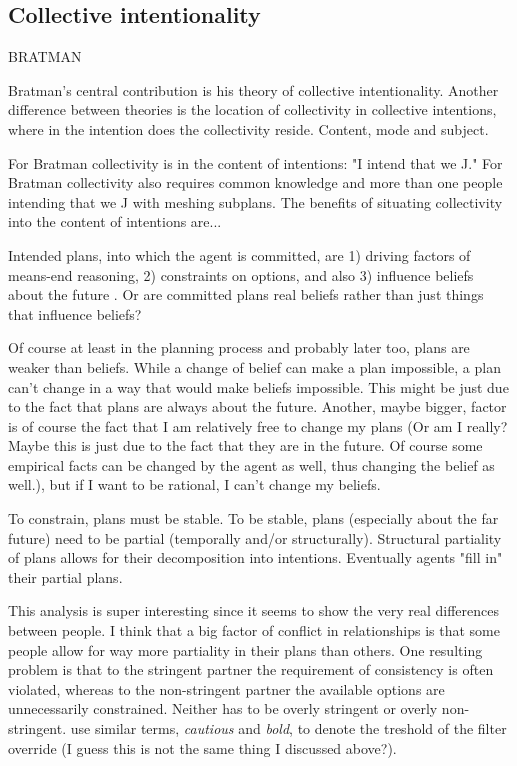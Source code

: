 \subsection{Collective intentionality}
BRATMAN

Bratman's central contribution is his theory of collective intentionality. Another difference between theories is the location of collectivity in collective intentions, where in the intention does the collectivity reside. Content, mode and subject.

For Bratman collectivity is in the content of intentions: "I intend that we J." For Bratman collectivity also requires common knowledge and more than one people intending that we J with meshing subplans. The benefits of situating collectivity into the content of intentions are...

Intended plans, into which the agent is committed, are 1) driving factors of means-end reasoning, 2) constraints on options, and also 3) influence beliefs about the future \citep*[p.~9]{bratman_plans_1988}. Or are committed plans real beliefs rather than just things that influence beliefs? 

Of course at least in the planning process and probably later too, plans are weaker than beliefs. While a change of belief can make a plan impossible, a plan can't change in a way that would make beliefs impossible. This might be just due to the fact that plans are always about the future. Another, maybe bigger, factor is of course the fact that I am relatively free to change my plans (Or am I really? Maybe this is just due to the fact that they are in the future. Of course some empirical facts can be changed by the agent as well, thus changing the belief as well.), but if I want to be rational, I can't change my beliefs.

To constrain, plans must be stable. To be stable, plans (especially about the far future) need to be partial (temporally and/or structurally). Structural partiality of plans allows for their decomposition into intentions. Eventually agents "fill in" their partial plans.

This analysis is super interesting since it seems to show the very real differences between people. I think that a big factor of conflict in relationships is that some people allow for way more partiality in their plans than others. One resulting problem is that to the stringent partner the requirement of consistency is often violated, whereas to the non-stringent partner the available options are unnecessarily constrained. Neither has to be overly stringent or overly non-stringent. \citep*[p.~20]{bratman_plans_1988} use similar terms, \textit{cautious} and \textit{bold}, to denote the treshold of the filter override (I guess this is not the same thing I discussed above?). 

